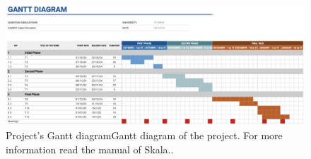 \begin{figure}[H]
  \centering
  \includegraphics[width=1\textwidth]{img/Gantt_diagram.png}
  \caption{Project's Gantt diagram{\footnotesize{Gantt diagram of the project. For more information read the manual \cite{skalagantt} of Skala.}.}}
  \label{fig:gantt_diagram}
\end{figure}

